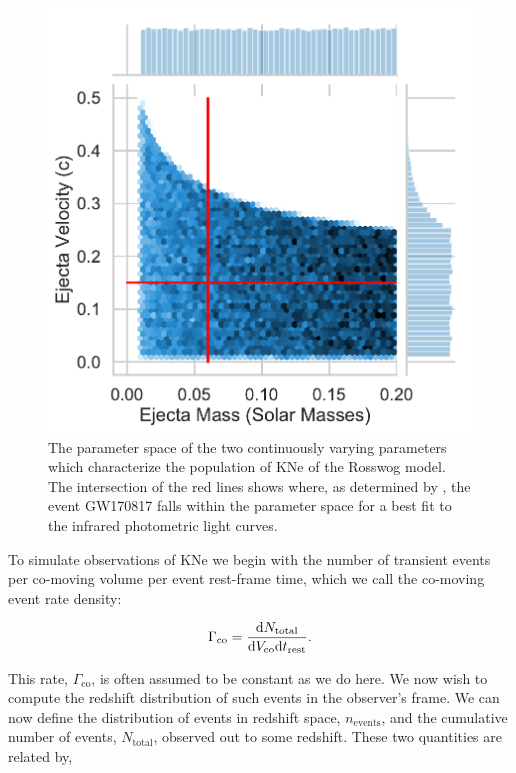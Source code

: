 \begin{figure}[h!]
  \centering
  \includegraphics[scale=0.7]{figures/Rosswog_parameter_dist}
  \caption{The parameter space of the two continuously varying parameters which characterize the population of KNe of the Rosswog model. The intersection of the red lines shows where, as determined by \citep{Rosswog2018}, the event GW170817 falls within the parameter space for a best fit to the infrared photometric light curves.}\label{fig: ross_params}
\end{figure}

To simulate observations of KNe we begin with the number of transient events per co-moving volume per event rest-frame time, which we call the co-moving event rate density:

\begin{equation}\label{eqn:erd}
   \Gamma_{\mathrm{co}} =\frac{\mathrm{d} N_{\mathrm{total}}}{\mathrm{d} V_{\mathrm{co}}\mathrm{d} t_{\mathrm{rest}}}.
\end{equation}\par

This rate, $\Gamma_{\mathrm{co}}$, is often assumed to be constant as we do here. We now wish to compute the redshift distribution of such events in the observer's frame. We can now define the distribution of events in redshift space, $n_{\mathrm{events}}$, and the cumulative number of events, $N_{\mathrm{total}}$, observed out to some redshift. These two quantities are related by,

